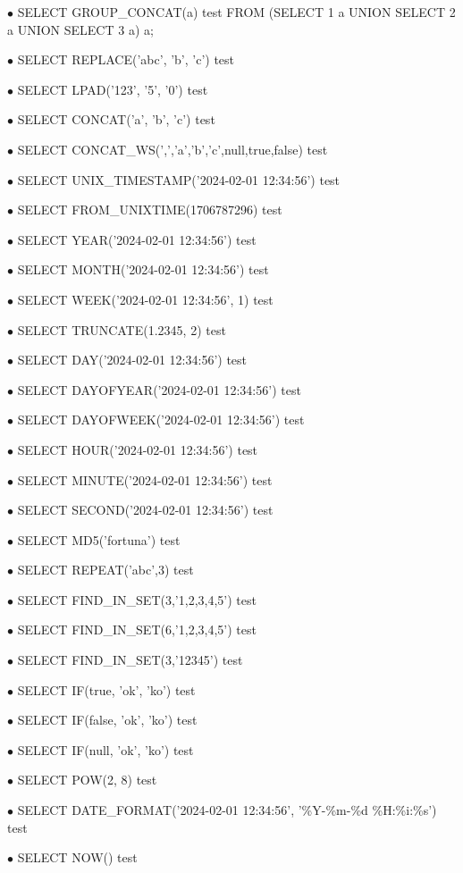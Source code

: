 \documentclass[a4paper]{article}
\begin{document}
\begin{compactitem}
\item[\color{myblue}$\bullet$] SELECT GROUP\_CONCAT(a) test FROM (SELECT 1 a UNION SELECT 2 a UNION SELECT 3 a) a;
\item[\color{myblue}$\bullet$] SELECT REPLACE('abc', 'b', 'c') test
\item[\color{myblue}$\bullet$] SELECT LPAD('123', '5', '0') test
\item[\color{myblue}$\bullet$] SELECT CONCAT('a', 'b', 'c') test
\item[\color{myblue}$\bullet$] SELECT CONCAT\_WS(',','a','b','c',null,true,false) test
\item[\color{myblue}$\bullet$] SELECT UNIX\_TIMESTAMP('2024-02-01 12:34:56') test
\item[\color{myblue}$\bullet$] SELECT FROM\_UNIXTIME(1706787296) test
\item[\color{myblue}$\bullet$] SELECT YEAR('2024-02-01 12:34:56') test
\item[\color{myblue}$\bullet$] SELECT MONTH('2024-02-01 12:34:56') test
\item[\color{myblue}$\bullet$] SELECT WEEK('2024-02-01 12:34:56', 1) test
\item[\color{myblue}$\bullet$] SELECT TRUNCATE(1.2345, 2) test
\item[\color{myblue}$\bullet$] SELECT DAY('2024-02-01 12:34:56') test
\item[\color{myblue}$\bullet$] SELECT DAYOFYEAR('2024-02-01 12:34:56') test
\item[\color{myblue}$\bullet$] SELECT DAYOFWEEK('2024-02-01 12:34:56') test
\item[\color{myblue}$\bullet$] SELECT HOUR('2024-02-01 12:34:56') test
\item[\color{myblue}$\bullet$] SELECT MINUTE('2024-02-01 12:34:56') test
\item[\color{myblue}$\bullet$] SELECT SECOND('2024-02-01 12:34:56') test
\item[\color{myblue}$\bullet$] SELECT MD5('fortuna') test
\item[\color{myblue}$\bullet$] SELECT REPEAT('abc',3) test
\item[\color{myblue}$\bullet$] SELECT FIND\_IN\_SET(3,'1,2,3,4,5') test
\item[\color{myblue}$\bullet$] SELECT FIND\_IN\_SET(6,'1,2,3,4,5') test
\item[\color{myblue}$\bullet$] SELECT FIND\_IN\_SET(3,'12345') test
\item[\color{myblue}$\bullet$] SELECT IF(true, 'ok', 'ko') test
\item[\color{myblue}$\bullet$] SELECT IF(false, 'ok', 'ko') test
\item[\color{myblue}$\bullet$] SELECT IF(null, 'ok', 'ko') test
\item[\color{myblue}$\bullet$] SELECT POW(2, 8) test
\item[\color{myblue}$\bullet$] SELECT DATE\_FORMAT('2024-02-01 12:34:56', '\%Y-\%m-\%d \%H:\%i:\%s') test
\item[\color{myblue}$\bullet$] SELECT NOW() test
\end{compactitem}
\end{document}

